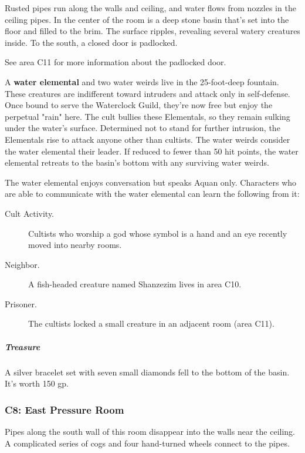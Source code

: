 \documentclass[10pt,a4paper,twoside,bg=print,twocolumn,openany,nodeprecatedcode]{dndbook}
\begin{document}
\begin{DndReadAloud}{}
Rusted pipes run along the walls and ceiling, and water flows from nozzles in the ceiling pipes. In the center of the room is a deep stone basin that's set into the floor and filled to the brim. The surface ripples, revealing several watery creatures inside. To the south, a closed door is padlocked.

\end{DndReadAloud}

See area C11 for more information about the padlocked door.

A \textbf{water elemental} and two water weirds live in the 25-foot-deep fountain. These creatures are indifferent toward intruders and attack only in self-defense. Once bound to serve the Waterclock Guild, they're now free but enjoy the perpetual "rain" here. The cult bullies these Elementals, so they remain sulking under the water's surface. Determined not to stand for further intrusion, the Elementals rise to attack anyone other than cultists. The water weirds consider the water elemental their leader. If reduced to fewer than 50 hit points, the water elemental retreats to the basin's bottom with any surviving water weirds.

The water elemental enjoys conversation but speaks Aquan only. Characters who are able to communicate with the water elemental can learn the following from it:


\begin{description}
\item[Cult Activity.]
Cultists who worship a god whose symbol is a hand and an eye recently moved into nearby rooms.
\item[Neighbor.]
A fish-headed creature named Shanzezim lives in area C10.
\item[Prisoner.]
The cultists locked a small creature in an adjacent room (area C11).
\end{description}

\subparagraph{Treasure}
A silver bracelet set with seven small diamonds fell to the bottom of the basin. It's worth 150 gp.

\subsubsection{C8: East Pressure Room}
\begin{DndReadAloud}{}
Pipes along the south wall of this room disappear into the walls near the ceiling. A complicated series of cogs and four hand-turned wheels connect to the pipes.

\end{DndReadAloud}
\end{document}
